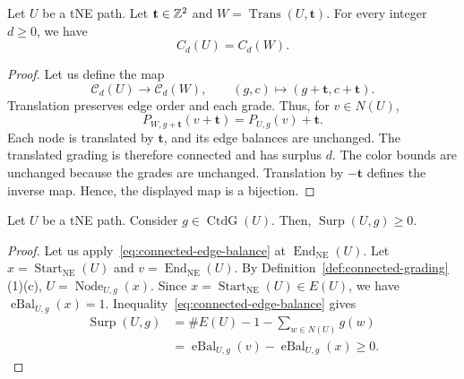 \begin{lemma}\label{lem:word-reindexing}
Let $U$ be a tNE path. Let $\mathbf t\in\mathbb Z^2$ and $W=\operatorname{Trans}(U,\mathbf t)$.
For every integer $d\ge0$, we have
\[
 C_d(U)=C_d(W).
\]
\end{lemma}
\begin{proof}
Let us define the map
\[
 \mathcal C_d(U)\longrightarrow\mathcal C_d(W),\qquad
 (g,c)\longmapsto(g+\mathbf t,c+\mathbf t).
\]
Translation preserves edge order and each grade. Thus, for $v\in N(U)$,
\[
 P_{W,g+\mathbf t}(v+\mathbf t)=P_{U,g}(v)+\mathbf t.
\]
Each node is translated by $\mathbf t$, and its edge balances are unchanged.
The translated grading is therefore connected and has surplus $d$.
The color bounds are unchanged because the grades are unchanged.
Translation by $-\mathbf t$ defines the inverse map. Hence, the displayed map is a bijection.
\end{proof}

\begin{lemma}\label{lem:residual-nonnegative}
Let $U$ be a tNE path. Consider $g\in\operatorname{CtdG}(U)$.
Then, \mbox{$\operatorname{Surp}(U,g)\ge0$}.
\end{lemma}
\begin{proof}
Let us apply~\eqref{eq:connected-edge-balance} at $\operatorname{End}_{\mathrm{NE}}(U)$.
Let $x=\operatorname{Start}_{\mathrm{NE}}(U)$ and $v=\operatorname{End}_{\mathrm{NE}}(U)$.
By Definition~\ref{def:connected-grading}(1)(c),
$U=\operatorname{Node}_{U,g}(x)$.
Since $x=\operatorname{Start}_{\mathrm{NE}}(U)\in E(U)$, we have $\operatorname{eBal}_{U,g}(x)=1$.
Inequality~\eqref{eq:connected-edge-balance} gives
\[
\begin{aligned}
 \operatorname{Surp}(U,g)&=\#E(U)-1-\sum_{w\in N(U)}g(w)\\
  &=\operatorname{eBal}_{U,g}(v)-\operatorname{eBal}_{U,g}(x)\ge0.
\end{aligned}
\]
\end{proof}

